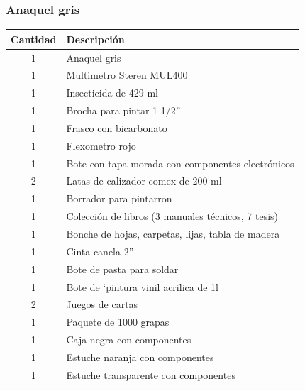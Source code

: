 \documentclass[a4paper,11pt]{article}                 %
\begin{document}
  \subsubsection{Anaquel gris}
    \begin{table}[H]
    \centering
    \begin{tabular}{|c|l|}
    \hline
    Cantidad & Descripción                                        \\ \hline
    1        & Anaquel gris                                       \\ \hline
    1        & Multimetro Steren MUL400                           \\ \hline
    1        & Insecticida de 429 ml                              \\ \hline
    1        & Brocha para pintar 1 1/2”                          \\ \hline
    1        & Frasco con bicarbonato                             \\ \hline
    1        & Flexometro rojo                                    \\ \hline
    1        & Bote con tapa morada con componentes electrónicos  \\ \hline
    2        & Latas de calizador comex de 200 ml                 \\ \hline
    1        & Borrador para pintarron                            \\ \hline
    1        & Colección de libros (3 manuales técnicos, 7 tesis) \\ \hline
    1        & Bonche de hojas, carpetas, lijas, tabla de madera  \\ \hline
    1        & Cinta canela 2”                                    \\ \hline
    1        & Bote de pasta para soldar                          \\ \hline
    1        & Bote de `pintura vinil acrilica de 1l              \\ \hline
    2        & Juegos de cartas                                   \\ \hline
    1        & Paquete de 1000 grapas                             \\ \hline
    1        & Caja negra con componentes                         \\ \hline
    1        & Estuche naranja con componentes                    \\ \hline
    1        & Estuche transparente con componentes               \\ \hline

\end{tabular}
\end{table}
\end{document}
